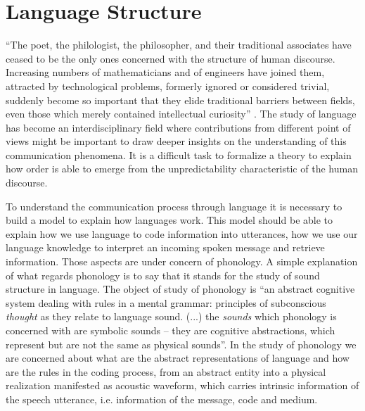 \chapter{Language Structure}
``The poet, the philologist, the philosopher, and their traditional associates have ceased
to be the only ones concerned with the structure of human discourse. Increasing numbers
of mathematicians and of engineers have joined them, attracted by technological problems,
formerly ignored or considered trivial, suddenly become so important that they elide traditional
barriers between fields, even those which merely contained intellectual curiosity'' \cite{mandelbrot1965}.
The study of language has become an interdisciplinary field
where contributions from different point of views might be important to draw deeper insights
on the understanding of this communication phenomena. It is a difficult task
to formalize a theory to explain how order is able to emerge from the unpredictability characteristic 
of the human discourse.

To understand the communication process through language it is necessary to build a model to explain how languages work. 
This model should be able to explain how we use language to code information into utterances, how we use our language knowledge 
to interpret an incoming spoken message and retrieve information. Those aspects are under concern 
of phonology. A simple explanation of what regards phonology is to say that it stands for the study of sound structure in language. 
The object of study of phonology is ``an abstract cognitive system dealing with rules in a mental grammar: principles of subconscious 
\textit{thought} as they relate to language sound. (...) the \textit{sounds} which phonology is concerned with are symbolic sounds -- 
they are cognitive abstractions, which represent but are not the same as physical sounds''\citep{odden2005}. 
In the study of phonology we are concerned about what are the abstract representations of language and how are the rules in 
the coding process, from an abstract entity into a physical realization manifested as acoustic waveform, which carries 
intrinsic information of the speech utterance, i.e. information of the message, code and medium.

